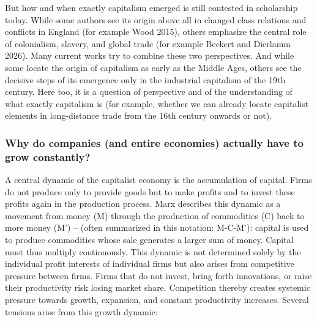 \documentclass[
  british,
  a4paper,
  DIV=11,
  numbers=noendperiod,
  oneside,
  openany]{scrreprt}
\begin{document}
But how and when exactly capitalism emerged is still contested in
scholarship today. While some authors see its origin above all in
changed class relations and conflicts in England (for example Wood
2015), others emphasize the central role of colonialism, slavery, and
global trade (for example Beckert and Dierlamm 2026). Many current works
try to combine these two perspectives. And while some locate the origin
of capitalism as early as the Middle Ages, others see the decisive steps
of its emergence only in the industrial capitalism of the 19th century.
Here too, it is a question of perspective and of the understanding of
what exactly capitalism is (for example, whether we can already locate
capitalist elements in long-distance trade from the 16th century onwards
or not).

\subsubsection{Why do companies (and entire economies) actually have to
grow
constantly?}\label{why-do-companies-and-entire-economies-actually-have-to-grow-constantly}

A central dynamic of the capitalist economy is the accumulation of
capital. Firms do not produce only to provide goods but to make profits
and to invest these profits again in the production process. Marx
describes this dynamic as a movement from money (M) through the
production of commodities (C) back to more money (M') -- (often
summarized in this notation: M-C-M'): capital is used to produce
commodities whose sale generates a larger sum of money. Capital must
thus multiply continuously. This dynamic is not determined solely by the
individual profit interests of individual firms but also arises from
competitive pressure between firms. Firms that do not invest, bring
forth innovations, or raise their productivity risk losing market share.
Competition thereby creates systemic pressure towards growth, expansion,
and constant productivity increases. Several tensions arise from this
growth dynamic:
\end{document}
